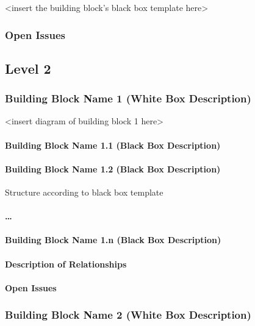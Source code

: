 \documentclass[]{article}
\begin{document}
\textless{}insert the building block's black box template
here\textgreater{}

\subsubsection{Open Issues}

\subsection{Level 2}

\subsubsection{Building Block Name 1 (White Box Description)}

\textless{}insert diagram of building block 1 here\textgreater{}

\paragraph{Building Block Name 1.1 (Black Box Description)}

\paragraph{Building Block Name 1.2 (Black Box Description)}

Structure according to black box template

\paragraph{\ldots{}}

\paragraph{Building Block Name 1.n (Black Box Description)}

\paragraph{Description of Relationships}

\paragraph{Open Issues}

\subsubsection{Building Block Name 2 (White Box Description)}
\end{document}
